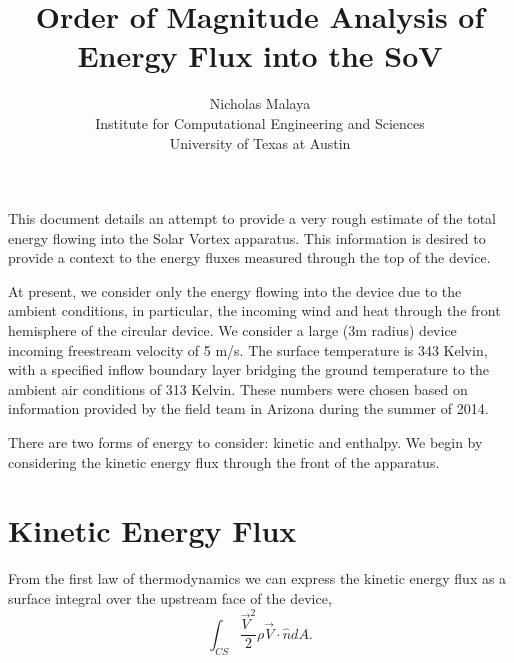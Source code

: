 \documentclass{article}
\title{\bf{Order of Magnitude Analysis of Energy Flux into the SoV}}
\author{Nicholas Malaya \\ Institute for Computational Engineering and Sciences \\ University of Texas at Austin} \date{}
\begin{document}
\maketitle

This document details an attempt to provide a very rough estimate of the
total energy flowing into the Solar Vortex apparatus. This information
is desired to provide a context to the energy fluxes measured through
the top of the device. 

At present, we consider only the energy flowing into the device due to
the ambient conditions, in particular, the incoming wind and heat
through the front hemisphere of the circular device. We consider a large
(3m radius) device incoming freestream velocity of 5 m/s. The surface
temperature is 343 Kelvin, with a specified inflow boundary layer
bridging the ground temperature to the ambient air conditions of 313
Kelvin. These numbers were chosen based on information provided by the
field team in Arizona during the summer of 2014. 

There are two forms of energy to consider: kinetic and enthalpy. We
begin by considering the kinetic energy flux through the front of the
apparatus. 

\section*{Kinetic Energy Flux}

From the first law of thermodynamics we can express the kinetic energy
flux as a surface integral over the upstream face of the device, 
\begin{equation*}
\int_{CS} \frac{\vec V^2}{2} \rho \vec V \cdot \hat n dA.
\end{equation*}
%
%
\end{document}
